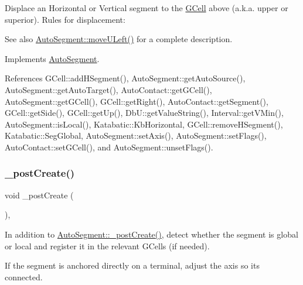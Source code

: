 Displace an Horizontal or Vertical segment to the \hyperlink{classKatabatic_1_1GCell}{G\+Cell} above (a.\+k.\+a. upper or superior). Rules for displacement\+:

\begin{DoxySeeAlso}{See also}
\hyperlink{classKatabatic_1_1AutoSegment_af8ca7b17e952f4b599aeeb2f4e5be395}{Auto\+Segment\+::move\+U\+Left()} for a complete description. 
\end{DoxySeeAlso}


Implements \hyperlink{classKatabatic_1_1AutoSegment_ad7fd54ca229fcf5ccd99f87b019b9cbc}{Auto\+Segment}.



References G\+Cell\+::add\+H\+Segment(), Auto\+Segment\+::get\+Auto\+Source(), Auto\+Segment\+::get\+Auto\+Target(), Auto\+Contact\+::get\+G\+Cell(), Auto\+Segment\+::get\+G\+Cell(), G\+Cell\+::get\+Right(), Auto\+Contact\+::get\+Segment(), G\+Cell\+::get\+Side(), G\+Cell\+::get\+Up(), Db\+U\+::get\+Value\+String(), Interval\+::get\+V\+Min(), Auto\+Segment\+::is\+Local(), Katabatic\+::\+Kb\+Horizontal, G\+Cell\+::remove\+H\+Segment(), Katabatic\+::\+Seg\+Global, Auto\+Segment\+::set\+Axis(), Auto\+Segment\+::set\+Flags(), Auto\+Contact\+::set\+G\+Cell(), and Auto\+Segment\+::unset\+Flags().

\mbox{\label{classKatabatic_1_1AutoVertical_a3715b38135ca24745f610bebd3407c10}} 
\subsubsection{\texorpdfstring{\+\_\+post\+Create()}{\_postCreate()}}
{\footnotesize\ttfamily void \+\_\+post\+Create (\begin{DoxyParamCaption}{ }\end{DoxyParamCaption})\hspace{0.3cm}{\ttfamily [protected]}, {\ttfamily [virtual]}}

In addition to \hyperlink{classKatabatic_1_1AutoSegment_a3715b38135ca24745f610bebd3407c10}{Auto\+Segment\+::\+\_\+post\+Create()}, detect whether the segment is global or local and register it in the relevant G\+Cells (if needed).

If the segment is anchored directly on a terminal, adjust the axis so it\textquotesingle{}s connected. 

